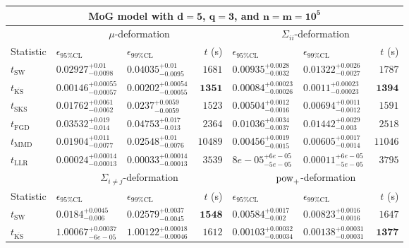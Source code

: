 \begin{tabular}{l|llr|llr}
	\toprule
	\multicolumn{7}{c}{{\bf MoG model with $\mathbf{d=5}$, $\mathbf{q=3}$, and $\mathbf{n=m=10^{5}}$}} \\
	\toprule
	\multicolumn{1}{c}{} & \multicolumn{3}{c}{$\mu$-deformation} & \multicolumn{3}{c}{$\Sigma_{ii}$-deformation} \\
	Statistic & $\epsilon_{95\%\mathrm{CL}}$ & $\epsilon_{99\%\mathrm{CL}}$ & $t$ (s) & $\epsilon_{95\%\mathrm{CL}}$ & $\epsilon_{99\%\mathrm{CL}}$ & $t$ (s) \\
	\midrule
	$t_{\mathrm{SW}}$ & $0.02927_{-0.0098}^{+0.01}$ & $0.04035_{-0.0095}^{+0.01}$ & $1681$ & $0.00935_{-0.0032}^{+0.0028}$ & $0.01322_{-0.0027}^{+0.0026}$ & $1787$ \\
	$t_{\overline{\mathrm{KS}}}$ & ${\mathbf{0.00146_{-0.00057}^{+0.00055}}}$ & ${\mathbf{0.00202_{-0.00055}^{+0.00054}}}$ & ${\mathbf{1351}}$ & ${\mathbf{0.00084_{-0.00026}^{+0.00023}}}$ & ${\mathbf{0.0011_{-0.00023}^{+0.00023}}}$ & ${\mathbf{1394}}$ \\
	$t_{\mathrm{SKS}}$ & $0.01762_{-0.0062}^{+0.0061}$ & $0.0237_{-0.0059}^{+0.0059}$ & $1523$ & $0.00504_{-0.0016}^{+0.0012}$ & $0.00694_{-0.0012}^{+0.0011}$ & $1591$ \\
	$t_{\mathrm{FGD}}$ & $0.03532_{-0.014}^{+0.019}$ & $0.04753_{-0.013}^{+0.017}$ & $2364$ & $0.01036_{-0.0037}^{+0.0034}$ & $0.01442_{-0.003}^{+0.0029}$ & $2518$ \\
	$t_{\mathrm{MMD}}$ & $0.01904_{-0.0077}^{+0.011}$ & $0.02548_{-0.0076}^{+0.01}$ & $10489$ & $0.00456_{-0.0015}^{+0.0019}$ & $0.00605_{-0.0014}^{+0.0017}$ & $11046$ \\
	$t_{\mathrm{LLR}}$ & $0.00024_{-0.00013}^{+0.00014}$ & $0.00033_{-0.00013}^{+0.00014}$ & $3539$ & $8e-05_{-5e-05}^{+6e-05}$ & $0.00011_{-5e-05}^{+6e-05}$ & $3795$ \\
	\toprule
	\multicolumn{1}{c}{} & \multicolumn{3}{c}{$\Sigma_{i\neq j}$-deformation} & \multicolumn{3}{c}{$\rm{pow}_{+}$-deformation} \\
	Statistic & $\epsilon_{95\%\mathrm{CL}}$ & $\epsilon_{99\%\mathrm{CL}}$ & $t$ (s) & $\epsilon_{95\%\mathrm{CL}}$ & $\epsilon_{99\%\mathrm{CL}}$ & $t$ (s) \\
	\midrule
	$t_{\mathrm{SW}}$ & $0.0184_{-0.006}^{+0.0045}$ & $0.02579_{-0.0045}^{+0.0037}$ & ${\mathbf{1548}}$ & $0.00584_{-0.002}^{+0.0017}$ & $0.00823_{-0.0016}^{+0.0016}$ & $1647$ \\
	$t_{\overline{\mathrm{KS}}}$ & $1.00067_{-6e-05}^{+0.00037}$ & $1.00122_{-0.00046}^{+0.00018}$ & $1612$ & ${\mathbf{0.00103_{-0.00034}^{+0.00032}}}$ & ${\mathbf{0.00138_{-0.00031}^{+0.00031}}}$ & ${\mathbf{1377}}$ \\

\end{tabular}
